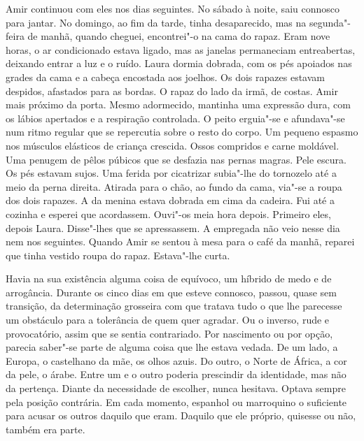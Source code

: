 Amir continuou com eles nos dias seguintes. No sábado à noite, saiu
connosco para jantar. No domingo, ao fim da tarde, tinha desaparecido,
mas na segunda"-feira de manhã, quando cheguei, encontrei"-o na cama do
rapaz. Eram nove horas, o ar condicionado estava ligado, mas as janelas
permaneciam entreabertas, deixando entrar a luz e o ruído. Laura dormia
dobrada, com os pés apoiados nas grades da cama e a cabeça encostada aos
joelhos. Os dois rapazes estavam despidos, afastados para as bordas. O
rapaz do lado da irmã, de costas. Amir mais próximo da porta. Mesmo
adormecido, mantinha uma expressão dura, com os lábios apertados e a
respiração controlada. O peito erguia"-se e afundava"-se num ritmo
regular que se repercutia sobre o resto do corpo. Um pequeno espasmo nos
músculos elásticos de criança crescida. Ossos compridos e carne
moldável. Uma penugem de pêlos púbicos que se desfazia nas pernas
magras. Pele escura. Os pés estavam sujos. Uma ferida por cicatrizar
subia"-lhe do tornozelo até a meio da perna direita. Atirada para o
chão, ao fundo da cama, via"-se a roupa dos dois rapazes. A da menina
estava dobrada em cima da cadeira. Fui até a cozinha e esperei que
acordassem. Ouvi"-os meia hora depois. Primeiro eles, depois Laura.
Disse"-lhes que se apressassem. A empregada não veio nesse dia nem nos
seguintes. Quando Amir se sentou à mesa para o café da manhã, reparei
que tinha vestido roupa do rapaz. Estava"-lhe curta.

Havia na sua existência alguma coisa de equívoco, um híbrido de medo e
de arrogância. Durante os cinco dias em que esteve connosco, passou,
quase sem transição, da determinação grosseira com que tratava tudo o
que lhe parecesse um obstáculo para a tolerância de quem quer agradar.
Ou o inverso, rude e provocatório, assim que se sentia contrariado. Por
nascimento ou por opção, parecia saber"-se parte de alguma coisa que lhe
estava vedada. De um lado, a Europa, o castelhano da mãe, os olhos
azuis. Do outro, o Norte de África, a cor da pele, o árabe. Entre um e o
outro poderia prescindir da identidade, mas não da pertença. Diante da
necessidade de escolher, nunca hesitava. Optava sempre pela posição
contrária. Em cada momento, espanhol ou marroquino o suficiente para
acusar os outros daquilo que eram. Daquilo que ele próprio, quisesse ou
não, também era parte.

